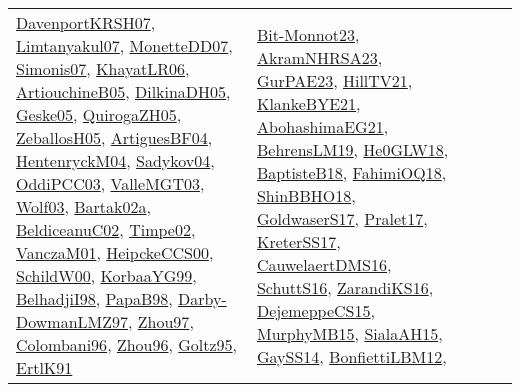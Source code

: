 {\begin{longtable}{lp{3cm}>{\raggedright}p{6cm}>{\raggedright}p{6cm}p{8cm}}
\href{papers/DavenportKRSH07.pdf}{DavenportKRSH07}\cite{DavenportKRSH07}, \href{papers/Limtanyakul07.pdf}{Limtanyakul07}\cite{Limtanyakul07}, \href{papers/MonetteDD07.pdf}{MonetteDD07}\cite{MonetteDD07}, \href{articles/Simonis07.pdf}{Simonis07}\cite{Simonis07}, \href{articles/KhayatLR06.pdf}{KhayatLR06}\cite{KhayatLR06}, \href{papers/ArtiouchineB05.pdf}{ArtiouchineB05}\cite{ArtiouchineB05}, \href{papers/DilkinaDH05.pdf}{DilkinaDH05}\cite{DilkinaDH05}, \href{papers/Geske05.pdf}{Geske05}\cite{Geske05}, \href{papers/QuirogaZH05.pdf}{QuirogaZH05}\cite{QuirogaZH05}, \href{articles/ZeballosH05.pdf}{ZeballosH05}\cite{ZeballosH05}, \href{papers/ArtiguesBF04.pdf}{ArtiguesBF04}\cite{ArtiguesBF04}, \href{papers/HentenryckM04.pdf}{HentenryckM04}\cite{HentenryckM04}, \href{papers/Sadykov04.pdf}{Sadykov04}\cite{Sadykov04}, \href{papers/OddiPCC03.pdf}{OddiPCC03}\cite{OddiPCC03}, \href{papers/ValleMGT03.pdf}{ValleMGT03}\cite{ValleMGT03}, \href{papers/Wolf03.pdf}{Wolf03}\cite{Wolf03}, \href{papers/Bartak02a.pdf}{Bartak02a}\cite{Bartak02a}, \href{papers/BeldiceanuC02.pdf}{BeldiceanuC02}\cite{BeldiceanuC02}, \href{articles/Timpe02.pdf}{Timpe02}\cite{Timpe02}, \href{papers/VanczaM01.pdf}{VanczaM01}\cite{VanczaM01}, \href{articles/HeipckeCCS00.pdf}{HeipckeCCS00}\cite{HeipckeCCS00}, \href{articles/SchildW00.pdf}{SchildW00}\cite{SchildW00}, \href{papers/KorbaaYG99.pdf}{KorbaaYG99}\cite{KorbaaYG99}, \href{articles/BelhadjiI98.pdf}{BelhadjiI98}\cite{BelhadjiI98}, \href{articles/PapaB98.pdf}{PapaB98}\cite{PapaB98}, \href{articles/Darby-DowmanLMZ97.pdf}{Darby-DowmanLMZ97}\cite{Darby-DowmanLMZ97}, \href{articles/Zhou97.pdf}{Zhou97}\cite{Zhou97}, \href{papers/Colombani96.pdf}{Colombani96}\cite{Colombani96}, \href{papers/Zhou96.pdf}{Zhou96}\cite{Zhou96}, \href{papers/Goltz95.pdf}{Goltz95}\cite{Goltz95}, \href{papers/ErtlK91.pdf}{ErtlK91}\cite{ErtlK91} & \href{papers/Bit-Monnot23.pdf}{Bit-Monnot23}\cite{Bit-Monnot23}, \href{articles/AkramNHRSA23.pdf}{AkramNHRSA23}\cite{AkramNHRSA23}, \href{articles/GurPAE23.pdf}{GurPAE23}\cite{GurPAE23}, \href{papers/HillTV21.pdf}{HillTV21}\cite{HillTV21}, \href{papers/KlankeBYE21.pdf}{KlankeBYE21}\cite{KlankeBYE21}, \href{articles/AbohashimaEG21.pdf}{AbohashimaEG21}\cite{AbohashimaEG21}, \href{papers/BehrensLM19.pdf}{BehrensLM19}\cite{BehrensLM19}, \href{papers/He0GLW18.pdf}{He0GLW18}\cite{He0GLW18}, \href{articles/BaptisteB18.pdf}{BaptisteB18}\cite{BaptisteB18}, \href{articles/FahimiOQ18.pdf}{FahimiOQ18}\cite{FahimiOQ18}, \href{articles/ShinBBHO18.pdf}{ShinBBHO18}\cite{ShinBBHO18}, \href{papers/GoldwaserS17.pdf}{GoldwaserS17}\cite{GoldwaserS17}, \href{papers/Pralet17.pdf}{Pralet17}\cite{Pralet17}, \href{articles/KreterSS17.pdf}{KreterSS17}\cite{KreterSS17}, \href{papers/CauwelaertDMS16.pdf}{CauwelaertDMS16}\cite{CauwelaertDMS16}, \href{papers/SchuttS16.pdf}{SchuttS16}\cite{SchuttS16}, \href{articles/ZarandiKS16.pdf}{ZarandiKS16}\cite{ZarandiKS16}, \href{papers/DejemeppeCS15.pdf}{DejemeppeCS15}\cite{DejemeppeCS15}, \href{papers/MurphyMB15.pdf}{MurphyMB15}\cite{MurphyMB15}, \href{papers/SialaAH15.pdf}{SialaAH15}\cite{SialaAH15}, \href{papers/GaySS14.pdf}{GaySS14}\cite{GaySS14}, \href{papers/BonfiettiLBM12.pdf}{BonfiettiLBM12}\cite{BonfiettiLBM12}, 
\end{longtable}}
